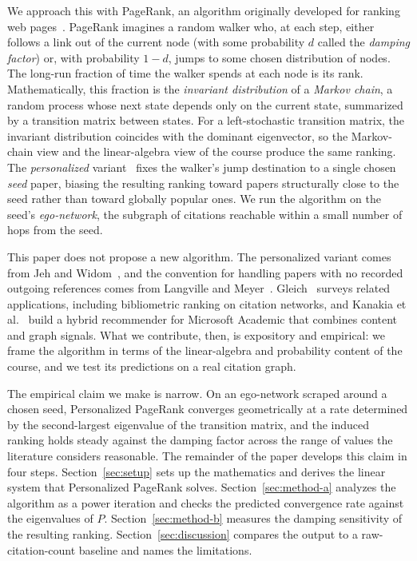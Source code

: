 \documentclass[conference]{IEEEtran}
\begin{document}
We approach this with PageRank, an algorithm originally
developed for ranking web pages~\cite{brin1998anatomy}. PageRank
imagines a random walker who, at each step, either follows a
link out of the current node (with some probability $d$ called
the \emph{damping factor}) or, with probability $1-d$, jumps to
some chosen distribution of nodes. The long-run fraction of time the walker
spends at each node is its rank. Mathematically, this fraction
is the \emph{invariant distribution} of a \emph{Markov chain},
a random process whose next state depends only on the current
state, summarized by a transition matrix between states. For a
left-stochastic transition matrix, the invariant distribution
coincides with the dominant eigenvector, so the Markov-chain
view and the linear-algebra view of the course produce the same
ranking. The
\emph{personalized} variant~\cite{jeh2003scaling} fixes the
walker's jump destination to a single chosen \emph{seed} paper,
biasing the resulting ranking toward papers structurally close
to the seed rather than toward globally popular ones. We run
the algorithm on the seed's \emph{ego-network}, the subgraph of
citations reachable within a small number of hops from the
seed.

This paper does not propose a new algorithm. The personalized
variant comes from Jeh and Widom~\cite{jeh2003scaling}, and the
convention for handling papers with no recorded outgoing
references comes from Langville and
Meyer~\cite{langville2004deeper}.
Gleich~\cite{gleich2015pagerank} surveys related applications,
including bibliometric ranking on citation networks, and
Kanakia et al.~\cite{kanakia2019hybrid} build a hybrid
recommender for Microsoft Academic that combines content and
graph signals. What we contribute, then, is expository and empirical: we
frame the algorithm in terms of the linear-algebra and
probability content of the course, and we test its predictions
on a real citation graph.

The empirical claim we make is narrow. On an ego-network
scraped around a chosen seed, Personalized PageRank converges
geometrically at a rate determined by the second-largest
eigenvalue of the transition matrix, and the induced ranking
holds steady against the damping factor across the range of
values the literature considers reasonable. The remainder of the paper
develops this claim in four steps. Section~\ref{sec:setup} sets
up the mathematics and derives the linear system that
Personalized PageRank solves. Section~\ref{sec:method-a}
analyzes the algorithm as a power iteration and checks the
predicted convergence rate against the eigenvalues of $P$.
Section~\ref{sec:method-b} measures the damping sensitivity of
the resulting ranking. Section~\ref{sec:discussion} compares the
output to a raw-citation-count baseline and names the
limitations.
\end{document}

